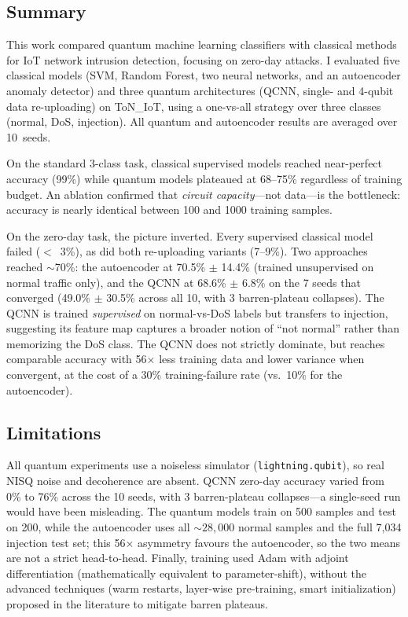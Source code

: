 \documentclass[11pt,a4paper]{article}
\let\OldSubsection\subsection
\let\OldSubsubsection\subsubsection
\renewcommand{\subsection}[1]{\OldSubsubsection{#1}}
\begin{document}
\OldSubsection*{Summary}

This work compared quantum machine learning classifiers with classical methods for IoT network intrusion detection, focusing on zero-day attacks. I evaluated five classical models (SVM, Random Forest, two neural networks, and an autoencoder anomaly detector) and three quantum architectures (QCNN, single- and 4-qubit data re-uploading) on ToN\_IoT, using a one-vs-all strategy over three classes (normal, DoS, injection). All quantum and autoencoder results are averaged over 10~seeds.

On the standard 3-class task, classical supervised models reached near-perfect accuracy (99\%) while quantum models plateaued at 68--75\% regardless of training budget. An ablation confirmed that \emph{circuit capacity}---not data---is the bottleneck: accuracy is nearly identical between 100 and 1000 training samples.

On the zero-day task, the picture inverted. Every supervised classical model failed ($<$~3\%), as did both re-uploading variants (7--9\%). Two approaches reached $\sim$70\%: the autoencoder at 70.5\% $\pm$ 14.4\% (trained unsupervised on normal traffic only), and the QCNN at 68.6\% $\pm$ 6.8\% on the 7 seeds that converged (49.0\% $\pm$ 30.5\% across all 10, with 3 barren-plateau collapses). The QCNN is trained \emph{supervised} on normal-vs-DoS labels but transfers to injection, suggesting its feature map captures a broader notion of ``not normal'' rather than memorizing the DoS class. The QCNN does not strictly dominate, but reaches comparable accuracy with 56$\times$ less training data and lower variance when convergent, at the cost of a 30\% training-failure rate (vs.\ 10\% for the autoencoder).

\OldSubsection*{Limitations}

All quantum experiments use a noiseless simulator (\texttt{lightning.qubit}), so real NISQ noise and decoherence are absent. QCNN zero-day accuracy varied from 0\% to 76\% across the 10 seeds, with 3 barren-plateau collapses---a single-seed run would have been misleading. The quantum models train on 500 samples and test on 200, while the autoencoder uses all ${\sim}28{,}000$ normal samples and the full 7,034 injection test set; this 56$\times$ asymmetry favours the autoencoder, so the two means are not a strict head-to-head. Finally, training used Adam with adjoint differentiation (mathematically equivalent to parameter-shift), without the advanced techniques (warm restarts, layer-wise pre-training, smart initialization) proposed in the literature to mitigate barren plateaus.
\end{document}
